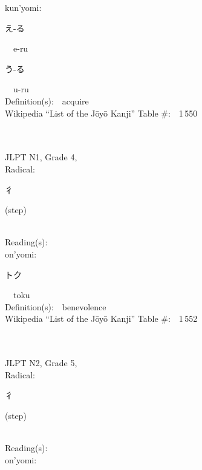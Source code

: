 \begin{multicols}{2}
{\hspace*{1em}}kun'yomi:\ \ \\
{\hspace*{2em}}{\begin{CJK}{UTF8}{min} え-る \end{CJK}}\ \ e-ru\ \ \\
{\hspace*{2em}}{\begin{CJK}{UTF8}{min} う-る \end{CJK}}\ \ u-ru\ \ \\
Definition(s):\ \ acquire \\
Wikipedia ``List of the J\=oy\=o Kanji'' Table \#:\ \ 1\,550 \\
\ \ \\
{\fontsize{34pt}{40pt}  }\ \ \\  %
{JLPT N1, Grade 4, \\Radical:\ \ {\begin{CJK}{UTF8}{min} 彳 \end{CJK}} (step) } \\
Reading(s):\ \ \\
{\hspace*{1em}}on'yomi:\ \ \\
{\hspace*{2em}}{\begin{CJK}{UTF8}{min} トク \end{CJK}}\ \ toku\ \ \\
Definition(s):\ \ benevolence \\
Wikipedia ``List of the J\=oy\=o Kanji'' Table \#:\ \ 1\,552 \\
\ \ \\
{\fontsize{34pt}{40pt}  }\ \ \\  %
{JLPT N2, Grade 5, \\Radical:\ \ {\begin{CJK}{UTF8}{min} 彳 \end{CJK}} (step) } \\
Reading(s):\ \ \\
{\hspace*{1em}}on'yomi:\ \ \\

\end{multicols}
